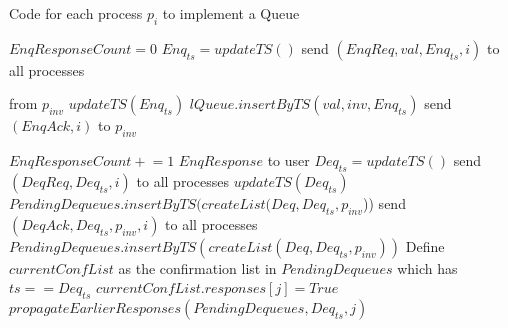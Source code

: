 \documentclass[a4paper,anonymous,USenglish]{lipics-v2021}
\theoremstyle{definition}
\newcommand{\pluseq}{\mathrel{+}=}
\begin{document}
\begin{algorithm}
  \caption{Code for each process $p_i$ to implement a Queue}\label{alg:fifo}
  \begin{algorithmic}[1]
    \label{fifoline:invEnq}
      \State $EnqResponseCount = 0$ 
      \State $Enq_{ts} = updateTS()$ \label{fifoline:enqTS} 
      \State send $(EnqReq, val, Enq_{ts}, i)$ to all processes\label{fifoline:sendEnqReq}
    \EndFunction

     from $p_{inv}$
      \State $updateTS(Enq_{ts})$ \label{fifoline:enqReqTSUpdate} 
      \State $lQueue.insertByTS(val, inv, Enq_{ts})$\label{fifoline:executeEnq} 
      \State send $(EnqAck, i)$ to $p_{inv}$ \label{fifoline:sendEnqAck} 
    \EndFunction

      \State $EnqResponseCount \pluseq 1$
        \Return $EnqResponse$ to user\label{fifoline:enqReturn} 
      \EndIf
    \EndFunction \label{fifoline:finishEnq}
%
      \State $Deq_{ts} = updateTS()$ \label{fifoline:deqTS}
      \State send $(DeqReq, Deq_{ts}, i)$ to all processes \label{fifoline:sendDeqReq}
    \EndFunction
%
    \State $updateTS(Deq_{ts})$ \label{fifoline:deqReqTSUpdate}
      \State $PendingDequeues.insertByTS(createList(Deq, Deq_{ts}, p_{inv}$))\label{fifoline:savePendingDeq}
      \EndIf
      \State send $(DeqAck, Deq_{ts}, p_{inv}, i)$ to all processes \label{fifoline:sendSafetyFlag}\label{fifoline:sendDeqAck}
    \EndFunction
%
        \State $PendingDequeues.insertByTS(createList(Deq, Deq_{ts},p_{inv}))$
      \EndIf
      \State Define $currentConfList$ as the confirmation list in $PendingDequeues$ which has $ts == Deq_{ts}$
      \State $currentConfList.responses[j] = True$ \label{fifoline:setResponse}
      \State $propagateEarlierResponses(PendingDequeues, Deq_{ts}, j)$ \label{fifoline:propagateEarlier}


\end{algorithmic}
\end{algorithm}
\end{document}
